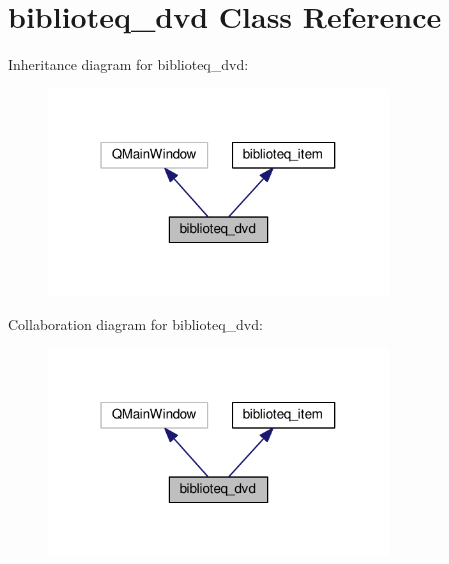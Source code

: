 \hypertarget{classbiblioteq__dvd}{}\section{biblioteq\+\_\+dvd Class Reference}
\label{classbiblioteq__dvd}


Inheritance diagram for biblioteq\+\_\+dvd\+:
\nopagebreak
\begin{figure}[H]
\begin{center}
\leavevmode
\includegraphics[width=256pt]{classbiblioteq__dvd__inherit__graph}
\end{center}
\end{figure}


Collaboration diagram for biblioteq\+\_\+dvd\+:
\nopagebreak
\begin{figure}[H]
\begin{center}
\leavevmode
\includegraphics[width=256pt]{classbiblioteq__dvd__coll__graph}
\end{center}
\end{figure}
